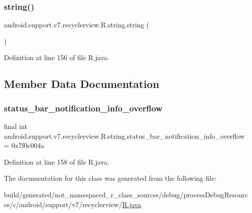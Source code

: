 \subsubsection{\texorpdfstring{string()}{string()}}
{\footnotesize\ttfamily android.\+support.\+v7.\+recyclerview.\+R.\+string.\+string (\begin{DoxyParamCaption}{ }\end{DoxyParamCaption})\hspace{0.3cm}{\ttfamily [private]}}



Definition at line 156 of file R.\+java.


\begin{DoxyCode}{0}

\end{DoxyCode}


\subsection{Member Data Documentation}
\mbox{\label{classandroid_1_1support_1_1v7_1_1recyclerview_1_1_r_1_1string_a1ea81bbbfacad9218b17fd12e0b9b258}} 
\subsubsection{\texorpdfstring{status\_bar\_notification\_info\_overflow}{status\_bar\_notification\_info\_overflow}}
{\footnotesize\ttfamily final int android.\+support.\+v7.\+recyclerview.\+R.\+string.\+status\+\_\+bar\+\_\+notification\+\_\+info\+\_\+overflow = 0x7f0c004a\hspace{0.3cm}{\ttfamily [static]}}



Definition at line 158 of file R.\+java.



The documentation for this class was generated from the following file\+:\begin{DoxyCompactItemize}
\item 
build/generated/not\+\_\+namespaced\+\_\+r\+\_\+class\+\_\+sources/debug/process\+Debug\+Resources/r/android/support/v7/recyclerview/\mbox{\hyperlink{android_2support_2v7_2recyclerview_2_r_8java}{R.\+java}}\end{DoxyCompactItemize}
